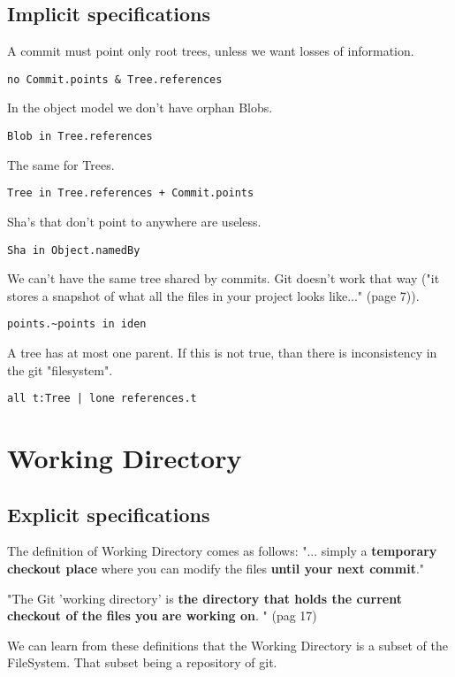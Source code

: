 \subsection{Implicit specifications}

A commit must point only root trees, unless we want
losses of information.
\begin{lstlisting}
no Commit.points & Tree.references    
\end{lstlisting}

In the object model we don't have orphan Blobs. 
\begin{lstlisting}
Blob in Tree.references
\end{lstlisting}

The same for Trees.
\begin{lstlisting}
Tree in Tree.references + Commit.points
\end{lstlisting}

Sha's that don't point to anywhere are useless.
\begin{lstlisting}
Sha in Object.namedBy
\end{lstlisting}

We can't have the same tree shared by commits. Git
doesn't work that way ("it stores a snapshot of what all 
the files in your project looks like..." \cite{gitComm} (page 7)).
\begin{lstlisting}
points.~points in iden 
\end{lstlisting}

A tree has at most one parent. If this is not true, than there 
is inconsistency in the git "filesystem".
\begin{lstlisting}
all t:Tree | lone references.t
\end{lstlisting}

\section{Working Directory}

\subsection{Explicit specifications}

The definition of Working Directory comes as follows:
"... simply a {\bf temporary checkout place} where you can 
modify the files {\bf until your next commit}."
\par
"The Git 'working directory' is {\bf the directory that holds 
the current \gls{checkout} of the files you are working on}.
"\cite{gitComm} (pag 17)\par
We can learn from these definitions that the Working Directory
is a subset of the FileSystem. That subset being a repository 
of git.

